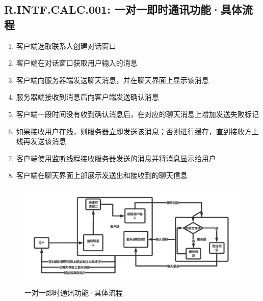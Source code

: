     \subsection{R.INTF.CALC.001: 一对一即时通讯功能·具体流程}
        \begin{enumerate}
            \item 客户端选取联系人创建对话窗口
            \item 客户端在对话窗口获取用户输入的消息
            \item 客户端向服务器端发送聊天消息，并在聊天界面上显示该消息
            \item 服务器端接收到消息后向客户端发送确认消息
            \item 客户端一段时间没有收到确认消息后，在对应的聊天消息上增加发送失败标记
            \item 如果接收用户在线，则服务器立即发送该消息；否则进行缓存，直到接收方上线再发送该消息
            \item 客户端使用监听线程接收服务器发送的消息并将消息显示给用户
            \item 客户端在聊天界面上部展示发送出和接收到的聊天信息
        \end{enumerate}
        \begin{figure}[h]
            \centering
            \includegraphics[scale=0.4]{OutlineDesign/figures/一对一即时通讯功能·具体流程.png}
            \caption{一对一即时通讯功能·具体流程}
            \label{fig:server_flow}
        \end{figure}
